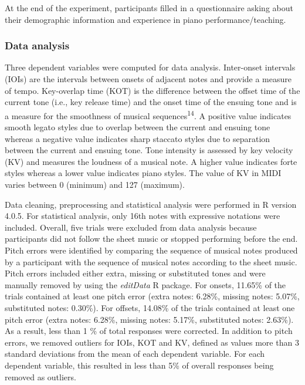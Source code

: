 \documentclass[
  man,floatsintext]{apa6}
\begin{document}
At the end of the experiment, participants filled in a questionnaire asking about their demographic information and experience in piano performance/teaching.

\hypertarget{data-analysis}{%
\subsubsection{Data analysis}\label{data-analysis}}

Three dependent variables were computed for data analysis. Inter-onset intervals (IOIs) are the intervals between onsets of adjacent notes and provide a measure of tempo. Key-overlap time (KOT) is the difference between the offset time of the current tone (i.e., key release time) and the onset time of the ensuing tone and is a measure for the smoothness of musical sequences\textsuperscript{14}. A positive value indicates smooth legato styles due to overlap between the current and ensuing tone whereas a negative value indicates sharp staccato styles due to separation between the current and ensuing tone. Tone intensity is assessed by key velocity (KV) and measures the loudness of a musical note. A higher value indicates forte styles whereas a lower value indicates piano styles. The value of KV in MIDI varies between 0 (minimum) and 127 (maximum).

Data cleaning, preprocessing and statistical analysis were performed in R version 4.0.5. For statistical analysis, only 16th notes with expressive notations were included. Overall, five trials were excluded from data analysis because participants did not follow the sheet music or stopped performing before the end. Pitch errors were identified by comparing the sequence of musical notes produced by a participant with the sequence of musical notes according to the sheet music. Pitch errors included either extra, missing or substituted tones and were manually removed by using the \emph{editData} R package. For onsets, 11.65\% of the trials contained at least one pitch error (extra notes: 6.28\%, missing notes: 5.07\%, substituted notes: 0.30\%). For offsets, 14.08\% of the trials contained at least one pitch error (extra notes: 6.28\%, missing notes: 5.17\%, substituted notes: 2.63\%). As a result, less than 1 \% of total responses were corrected. In addition to pitch errors, we removed outliers for IOIs, KOT and KV, defined as values more than 3 standard deviations from the mean of each dependent variable. For each dependent variable, this resulted in less than 5\% of overall responses being removed as outliers.
\end{document}
